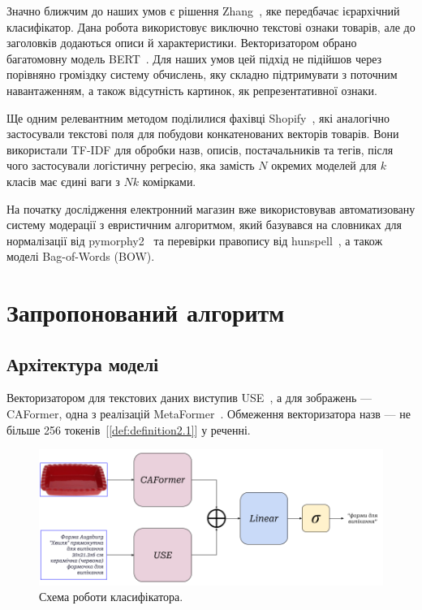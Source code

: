 \documentclass[fleqn,12pt,a4paper]{report}
\theoremstyle{plain}
\theoremstyle{definition}
\numberwithin{equation}{chapter}
\numberwithin{figure}{chapter}
\numberwithin{table}{chapter}
\numberwithin{footnote}{chapter}
\numberwithin{figure}{chapter}
\numberwithin{theorem}{chapter}
\numberwithin{definition}{chapter}
\begin{document}
    Значно ближчим до наших умов є рішення Zhang~\cite{Zhang2021}, яке передбачає ієрархічний класифікатор.
    Дана робота використовує виключно текстові ознаки товарів, але до заголовків додаються описи й характеристики.
    Векторизатором обрано багатомовну модель BERT~\cite{devlin-etal-2019-bert}.
    Для наших умов цей підхід не підійшов через порівняно громіздку систему обчислень, яку складно підтримувати з
    поточним навантаженням, а також відсутність картинок, як репрезентативної ознаки.

    Ще одним релевантним методом поділилися фахівці Shopify~\cite{shopify2020}, які аналогічно застосували текстові
    поля для побудови конкатенованих векторів товарів.
    Вони використали TF-IDF для обробки назв, описів, постачальників та тегів, після чого застосували логістичну
    регресію, яка замість $N$ окремих моделей для $k$ класів має єдині ваги з $Nk$ комірками.

    На початку дослідження електронний магазин вже використовував автоматизовану систему модерації з евристичним
    алгоритмом, який базувався на словниках для нормалізації від pymorphy2~\cite{pymorphy2} та перевірки правопису від
    hunspell~\cite{hunspell}, а також моделі Bag-of-Words (BOW).

    \newpage


    \chapter{Запропонований алгоритм}\label{ch:chaper1}


    \section{Архітектура моделі}\label{sec:section1.1}

    Векторизатором для текстових даних виступив USE~\cite{yang-etal-2020-multilingual}, а для зображень --- \\
    CAFormer, одна з реалізацій MetaFormer~\cite{10304335}.
    Обмеження векторизатора назв --- не більше 256 токенів~[\ref{def:definition2.1}] у реченні.

    \noindent
    \begin{figure}[ht]
        \includegraphics[width=\textwidth]{images/catify-concatenated-model}
        \caption{Схема роботи класифікатора.}
    \end{figure}
\end{document}
